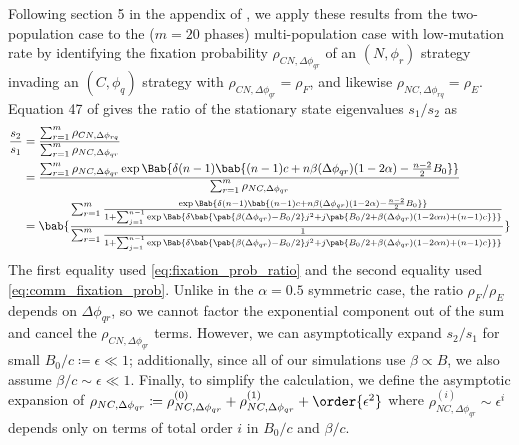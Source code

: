 Following section 5 in the appendix of \tripp{},
we apply these results from the two-population case
to the ($m=20$ phases) multi-population case with low-mutation rate
by identifying the fixation probability $\rho_{CN,\Delta \phi_{qr}}$
of an $(N,\phi_r)$ strategy invading an $(C,\phi_q)$ strategy
with $\rho_{CN,\Delta \phi_{qr}} = \rho_F$,
and likewise
$\rho_{NC,\Delta \phi_{rq}} = \rho_E$.
Equation 47 of \tripp{}
gives the ratio of the stationary state eigenvalues $s_1/s_2$ as
\begin{align}
  \frac{s_2}{s_1} &= \frac
    {\sum_{r=1}^{m} \rho_{CN,\Delta \phi_{rq}}}
    {\sum_{r=1}^{m} \rho_{NC,\Delta \phi_{qr}} }
  \\
  &=
  \frac
  {\sum_{r=1}^{m} \rho_{NC,\Delta \phi_{qr}}
    \exp \Bab{
      \delta (n-1)
      \bab{
        (n-1) c + n \beta(\Delta \phi_{qr}) (1 - 2 \alpha)
        - \frac{n-2}{2} B_0
      }
    }
  }
  {\sum_{r=1}^{m} \rho_{NC,\Delta \phi_{qr}}}
  \\
  &=
  \bab{
    \frac
    {\sum_{r=1}^{m} \frac
      {\exp \Bab{ \delta (n-1)
        \bab{
          (n-1) c + n \beta(\Delta \phi_{qr}) (1 - 2 \alpha) - \frac{n-2}{2} B_0
        }}
      }
      {1 + \sum_{j=1}^{n-1} \exp\Bab{
        \delta \bab{
         \pab{\beta(\Delta \phi_{qr}) - B_0/2} j^2
         + j \pab{B_0/2 + \beta(\Delta \phi_{qr}) (1 - 2 \alpha n) + (n-1) c}
        }}
      }
    }
    {\sum_{r=1}^{m} \frac{1}
      {1 + \sum_{j=1}^{n-1} \exp\Bab{
        \delta \bab{
         \pab{\beta(\Delta \phi_{qr}) - B_0/2} j^2
         + j \pab{B_0/2 + \beta(\Delta \phi_{qr}) (1 - 2 \alpha n) + (n-1) c}
        }}
      }
    }
  }
  \label{eq:full_analytic_frac}
\end{align}
The first equality used \cref{eq:fixation_prob_ratio}
and the second equality used \cref{eq:comm_fixation_prob}.
Unlike in the $\alpha = 0.5$ symmetric case,
the ratio $\rho_F/\rho_E$ depends on $\Delta \phi_{qr}$,
so we cannot factor the exponential component out of the sum
and cancel the $\rho_{CN,\Delta \phi_{qr}}$ terms.
However, we can asymptotically expand $s_2/s_1$ for small
$B_0/c \coloneqq \epsilon \ll 1$;
additionally, since all of our simulations use $\beta \propto B$,
we also assume $\beta/c \sim \epsilon \ll 1$.
Finally, to simplify the calculation,
we define the asymptotic expansion of
$\rho_{NC,\Delta \phi_{qr}} \coloneqq
\rho_{NC,\Delta \phi_{qr}}^{(0)}
+
\rho_{NC,\Delta \phi_{qr}}^{(1)}
+
\order{\epsilon^2}
$
where
$
\rho_{NC,\Delta \phi_{qr}}^{(i)} \sim \epsilon^i
$
depends only on terms of total order $i$ in $B_0/c$ and $\beta/c$.


